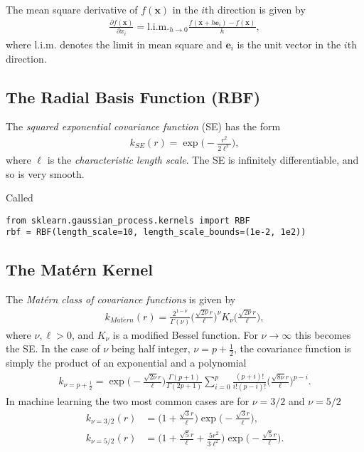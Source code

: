 \documentclass[twoside,english]{uiofysmaster}
\begin{document}
The mean square derivative of $f(\textbf{x})$ in the $i$th direction is given by
\begin{align}
\frac{\partial f (\textbf{x})}{\partial x_i} = \text{l.i.m.}_{h \rightarrow 0} \frac{f(\textbf{x} + h \textbf{e}_i) - f(\textbf{x})}{h},
\end{align}
where l.i.m. denotes the limit in mean square and $\textbf{e}_i$ is the unit vector in the $i$th direction.

\subsection{The Radial Basis Function (RBF)}

The \textit{squared exponential covariance function} (SE) has the form 
\begin{align}
k_{SE} (r) = \exp \Big( - \frac{r^2}{2 \ell^2} \Big),
\end{align} 
where $\ell$ is the \textit{characteristic length scale}. The SE is infinitely differentiable, and so is very smooth. 

Called 
\begin{lstlisting}
from sklearn.gaussian_process.kernels import RBF
rbf = RBF(length_scale=10, length_scale_bounds=(1e-2, 1e2))
\end{lstlisting}



\subsection{The Mat\'{e}rn Kernel}

The \textit{Mat\'{e}rn class of covariance functions} is given by
\begin{align}
k_{Mat\acute{e}rn} (r) = \frac{2^{1- \nu}}{\Gamma (\nu)} \Big( \frac{\sqrt{2 \nu} r	}{\ell} \Big)^{\nu} K_{\nu} \Big( \frac{\sqrt{2 \nu}r}{\ell} \Big),
\end{align}
where $\nu, \ell > 0$, and $K_{\nu}$ is a modified Bessel function. For $\nu \rightarrow \infty$ this becomes the SE. In the case of $\nu$ being half integer, $\nu = p + \frac{1}{2}$, the covariance function is simply the product of an exponential and a polynomial
\begin{align}
k_{\nu=p+\frac{1}{2}} = \exp \Big(- \frac{\sqrt{2 \nu} r	}{\ell} \Big) \frac{\Gamma(p+1)}{\Gamma(2p + 1)} \sum^p_{i=0} \frac{(p+i)!}{i!(p-i)!} \Big( \frac{\sqrt{8 \nu} r	}{\ell} \Big)^{p-i}.
\end{align}
In machine learning the two most common cases are for $\nu = 3/2$ and $\nu = 5/2$
\begin{align}
k_{\nu = 3/2}(r) &=  \Big(1 + \frac{\sqrt{3}r}{\ell} \Big) \exp \Big( -\frac{\sqrt{3}r}{\ell} \Big),\\
k_{\nu = 5/2}(r) &=  \Big(1 + \frac{\sqrt{5}r}{\ell}  + \frac{5r^2}{3 \ell^2}\Big) \exp \Big( -\frac{\sqrt{5}r}{\ell} \Big).
\end{align}
\end{document}
